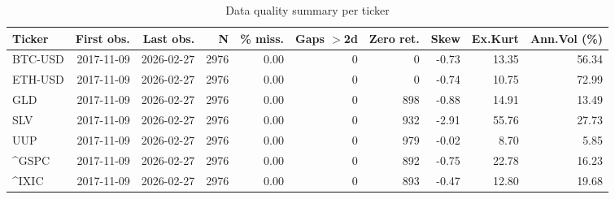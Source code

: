 \begin{table}[H]
\centering
\small
\caption{Data quality summary per ticker}
\label{tab:data_quality}
\begin{tabular}{lrrrrrrrrr}
\toprule
Ticker & First obs. & Last obs. & N & \% miss. & Gaps $>$2d & Zero ret. & Skew & Ex.Kurt & Ann.Vol (\%) \\
\midrule
BTC-USD & 2017-11-09 & 2026-02-27 & 2976 & 0.00 & 0 & 0 & -0.73 & 13.35 & 56.34 \\
ETH-USD & 2017-11-09 & 2026-02-27 & 2976 & 0.00 & 0 & 0 & -0.74 & 10.75 & 72.99 \\
GLD & 2017-11-09 & 2026-02-27 & 2976 & 0.00 & 0 & 898 & -0.88 & 14.91 & 13.49 \\
SLV & 2017-11-09 & 2026-02-27 & 2976 & 0.00 & 0 & 932 & -2.91 & 55.76 & 27.73 \\
UUP & 2017-11-09 & 2026-02-27 & 2976 & 0.00 & 0 & 979 & -0.02 & 8.70 & 5.85 \\
^GSPC & 2017-11-09 & 2026-02-27 & 2976 & 0.00 & 0 & 892 & -0.75 & 22.78 & 16.23 \\
^IXIC & 2017-11-09 & 2026-02-27 & 2976 & 0.00 & 0 & 893 & -0.47 & 12.80 & 19.68 \\
\bottomrule
\end{tabular}
\end{table}